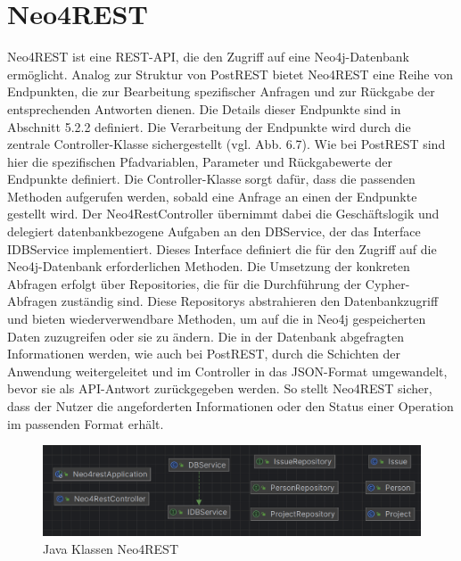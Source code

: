 \section{Neo4REST} %
\label{sec:neo4rest}
Neo4REST ist eine REST-API, die den Zugriff auf eine Neo4j-Datenbank ermöglicht. Analog zur Struktur von PostREST bietet Neo4REST eine Reihe von Endpunkten, die zur Bearbeitung spezifischer Anfragen und zur Rückgabe der entsprechenden Antworten dienen. Die Details dieser Endpunkte sind in Abschnitt 5.2.2 definiert.
\noindent 
Die Verarbeitung der Endpunkte wird durch die zentrale Controller-Klasse sichergestellt (vgl. Abb. 6.7). Wie bei PostREST sind hier die spezifischen Pfadvariablen, Parameter und Rückgabewerte der Endpunkte definiert. Die Controller-Klasse sorgt dafür, dass die passenden Methoden aufgerufen werden, sobald eine Anfrage an einen der Endpunkte gestellt wird.
\noindent 
Der Neo4RestController übernimmt dabei die Geschäftslogik und delegiert datenbankbezogene Aufgaben an den DBService, der das Interface IDBService implementiert. Dieses Interface definiert die für den Zugriff auf die Neo4j-Datenbank erforderlichen Methoden. Die Umsetzung der konkreten Abfragen erfolgt über Repositories, die für die Durchführung der Cypher-Abfragen zuständig sind. Diese Repositorys abstrahieren den Datenbankzugriff und bieten wiederverwendbare Methoden, um auf die in Neo4j gespeicherten Daten zuzugreifen oder sie zu ändern.
\noindent 
Die in der Datenbank abgefragten Informationen werden, wie auch bei PostREST, durch die Schichten der Anwendung weitergeleitet und im Controller in das JSON-Format umgewandelt, bevor sie als API-Antwort zurückgegeben werden. So stellt Neo4REST sicher, dass der Nutzer die angeforderten Informationen oder den Status einer Operation im passenden Format erhält.
\begin{figure}[H]
	\centering
	\includegraphics[scale=0.5]{Illustrations/neo4rest.png}
	\caption{Java Klassen Neo4REST}
\end{figure}

